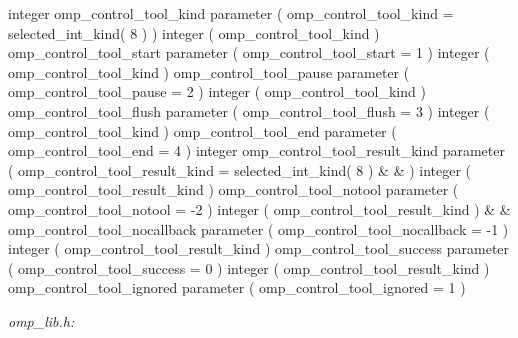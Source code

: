 {\begin{ompfSyntax}
      integer omp_control_tool_kind
      parameter ( omp_control_tool_kind = selected_int_kind( 8 ) )
      integer ( omp_control_tool_kind ) omp_control_tool_start
      parameter ( omp_control_tool_start = 1 )
      integer ( omp_control_tool_kind ) omp_control_tool_pause
      parameter ( omp_control_tool_pause = 2 )
      integer ( omp_control_tool_kind ) omp_control_tool_flush
      parameter ( omp_control_tool_flush = 3 )
      integer ( omp_control_tool_kind ) omp_control_tool_end
      parameter ( omp_control_tool_end = 4 )
      integer omp_control_tool_result_kind
      parameter ( omp_control_tool_result_kind = selected_int_kind( 8 ) &
     & )
      integer ( omp_control_tool_result_kind ) omp_control_tool_notool
      parameter ( omp_control_tool_notool = -2 )
      integer ( omp_control_tool_result_kind )                          &
     & omp_control_tool_nocallback
      parameter ( omp_control_tool_nocallback = -1 )
      integer ( omp_control_tool_result_kind ) omp_control_tool_success
      parameter ( omp_control_tool_success = 0 )
      integer ( omp_control_tool_result_kind ) omp_control_tool_ignored
      parameter ( omp_control_tool_ignored = 1 )
\end{ompfSyntax}}

\emph{omp\_lib.h:}

